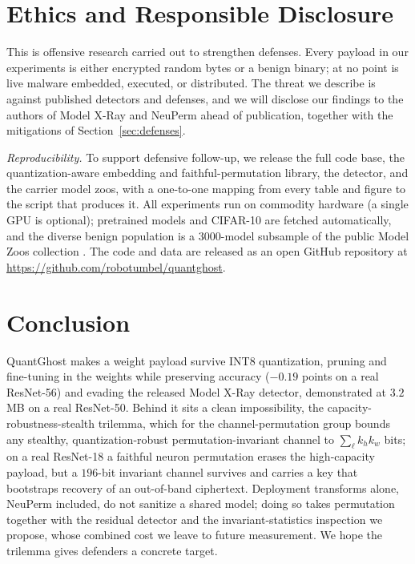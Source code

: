 \documentclass[a4paper,fleqn]{cas-dc}
\theoremstyle{plain}
\theoremstyle{remark}
\newcommand{\sys}{\mbox{QuantGhost}}
\begin{document}
\section{Ethics and Responsible Disclosure}\label{sec:ethics}
This is offensive research carried out to strengthen defenses. Every payload in our
experiments is either encrypted random bytes or a benign binary; at no point is live
malware embedded, executed, or distributed. The threat we describe is against published
detectors and defenses, and we will disclose our findings to the authors of Model X-Ray
and NeuPerm ahead of publication, together with the mitigations of
Section~\ref{sec:defenses}.

\emph{Reproducibility.} To support defensive follow-up, we release the full code base, the
quantization-aware embedding and faithful-permutation library, the detector, and the
carrier model zoos, with a one-to-one mapping from every table and figure to the script
that produces it. All experiments run on commodity hardware (a single GPU is optional);
pretrained models and CIFAR-10 are fetched automatically, and the diverse benign population
is a $3000$-model subsample of the public Model Zoos collection \cite{schurholt2022modelzoos}.
The code and data are released as an open GitHub repository
\cite{quantghost_code} at \url{https://github.com/robotumbel/quantghost}.

\section{Conclusion}\label{sec:concl}
\sys{} makes a weight payload survive INT8 quantization, pruning and fine-tuning in the
weights while preserving accuracy ($-0.19$ points on a real ResNet-56) and evading the
released Model X-Ray detector, demonstrated at $3.2$\,MB on a real ResNet-50. Behind it sits
a clean impossibility, the capacity-robustness-stealth trilemma, which for the
channel-permutation group bounds any stealthy, quantization-robust permutation-invariant
channel to $\sum_\ell k_h k_w$ bits; on a real ResNet-18 a faithful neuron permutation erases
the high-capacity payload, but a $196$-bit invariant channel survives and carries a key that
bootstraps recovery of an out-of-band ciphertext. Deployment transforms alone, NeuPerm
included, do not sanitize a shared model; doing so takes permutation together with the
residual detector and the invariant-statistics inspection we propose, whose combined cost we
leave to future measurement. We hope the trilemma gives defenders a concrete target.
\end{document}
